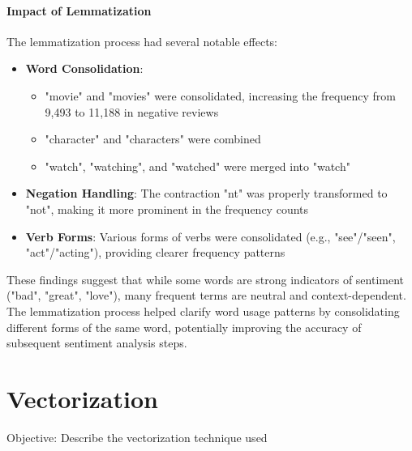 \documentclass[12pt]{article}
\begin{document}
\paragraph{Impact of Lemmatization}
The lemmatization process had several notable effects:
\begin{itemize}
    \item \textbf{Word Consolidation}: 
        \begin{itemize}
            \item "movie" and "movies" were consolidated, increasing the frequency from 9,493 to 11,188 in negative reviews
            \item "character" and "characters" were combined
            \item "watch", "watching", and "watched" were merged into "watch"
        \end{itemize}
    
    \item \textbf{Negation Handling}: The contraction "nt" was properly transformed to "not", making it more prominent in the frequency counts
    
    \item \textbf{Verb Forms}: Various forms of verbs were consolidated (e.g., "see"/"seen", "act"/"acting"), providing clearer frequency patterns
\end{itemize}

These findings suggest that while some words are strong indicators of sentiment ("bad", "great", "love"), many frequent terms are neutral and context-dependent. The lemmatization process helped clarify word usage patterns by consolidating different forms of the same word, potentially improving the accuracy of subsequent sentiment analysis steps.



\section{Vectorization}
Objective: Describe the vectorization technique used


\end{document}
